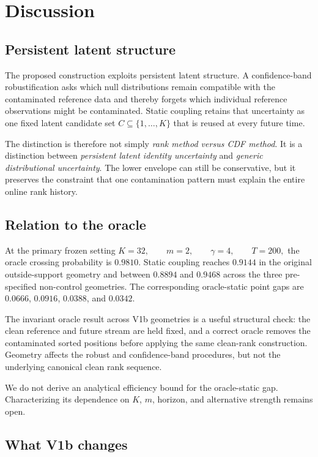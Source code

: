 \section{Discussion}

\subsection{Persistent latent structure}

The proposed construction exploits persistent latent structure. A confidence-band robustification asks which null distributions remain compatible with the contaminated reference data and thereby forgets which individual reference observations might be contaminated. Static coupling retains that uncertainty as one fixed latent candidate set
\(C\subseteq\{1,\ldots,K\}\)
that is reused at every future time.

The distinction is therefore not simply \emph{rank method versus CDF method}. It is a distinction between \emph{persistent latent identity uncertainty} and \emph{generic distributional uncertainty}.
The lower envelope can still be conservative, but it preserves the constraint that one contamination pattern must explain the entire online rank history.

\subsection{Relation to the oracle}

At the primary frozen setting
\(K=32,\qquad m=2,\qquad \gamma=4,\qquad T=200,\)
the oracle crossing probability is \(0.9810\). Static coupling reaches \(0.9144\) in the original outside-support geometry and between \(0.8894\) and \(0.9468\) across the three pre-specified non-control geometries. The corresponding oracle-static point gaps are \(0.0666\), \(0.0916\), \(0.0388\), and \(0.0342\).

The invariant oracle result across V1b geometries is a useful structural check: the clean reference and future stream are held fixed, and a correct oracle removes the contaminated sorted positions before applying the same clean-rank construction. Geometry affects the robust and confidence-band procedures, but not the underlying canonical clean rank sequence.

We do not derive an analytical efficiency bound for the oracle-static gap. Characterizing its dependence on \(K\), \(m\), horizon, and alternative strength remains open.

\subsection{What V1b changes}

